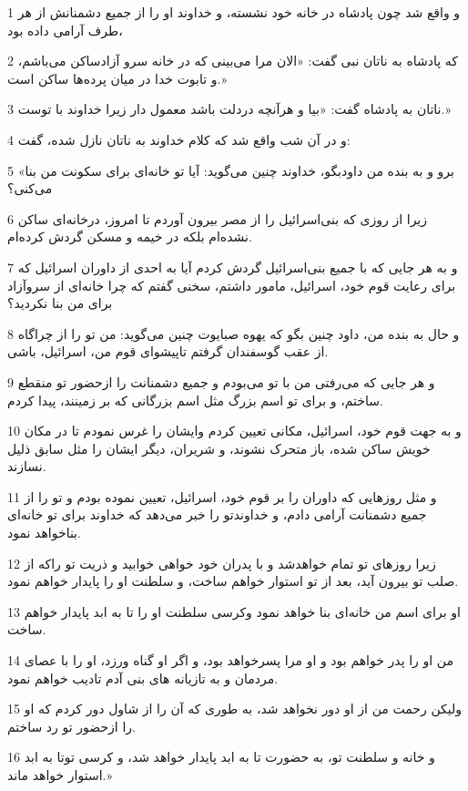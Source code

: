 \par 1 و واقع شد چون پادشاه در خانه خود نشسته، و خداوند او را از جمیع دشمنانش از هر طرف آرامی داده بود، 
\par 2 که پادشاه به ناتان نبی گفت: «الان مرا می‌بینی که در خانه سرو آزادساکن می‌باشم، و تابوت خدا در میان پرده‌ها ساکن است.»
\par 3 ناتان به پادشاه گفت: «بیا و هر‌آنچه دردلت باشد معمول دار زیرا خداوند با توست.»
\par 4 و در آن شب واقع شد که کلام خداوند به ناتان نازل شده، گفت:
\par 5 «برو و به بنده من داودبگو، خداوند چنین می‌گوید: آیا تو خانه‌ای برای سکونت من بنا می‌کنی؟
\par 6 زیرا از روزی که بنی‌اسرائیل را از مصر بیرون آوردم تا امروز، درخانه‌ای ساکن نشده‌ام بلکه در خیمه و مسکن گردش کرده‌ام.
\par 7 و به هر جایی که با جمیع بنی‌اسرائیل گردش کردم آیا به احدی از داوران اسرائیل که برای رعایت قوم خود، اسرائیل، مامور داشتم، سخنی گفتم که چرا خانه‌ای از سروآزاد برای من بنا نکردید؟
\par 8 و حال به بنده من، داود چنین بگو که یهوه صبایوت چنین می‌گوید: من تو را از چراگاه از عقب گوسفندان گرفتم تاپیشوای قوم من، اسرائیل، باشی.
\par 9 و هر جایی که می‌رفتی من با تو می‌بودم و جمیع دشمنانت را ازحضور تو منقطع ساختم، و برای تو اسم بزرگ مثل اسم بزرگانی که بر زمینند، پیدا کردم.
\par 10 و به جهت قوم خود، اسرائیل، مکانی تعیین کردم وایشان را غرس نمودم تا در مکان خویش ساکن شده، باز متحرک نشوند، و شریران، دیگر ایشان را مثل سابق ذلیل نسازند.
\par 11 و مثل روزهایی که داوران را بر قوم خود، اسرائیل، تعیین نموده بودم و تو را از جمیع دشمنانت آرامی دادم، و خداوندتو را خبر می‌دهد که خداوند برای تو خانه‌ای بناخواهد نمود.
\par 12 زیرا روزهای تو تمام خواهدشد و با پدران خود خواهی خوابید و ذریت تو راکه از صلب تو بیرون آید، بعد از تو استوار خواهم ساخت، و سلطنت او را پایدار خواهم نمود.
\par 13 او برای اسم من خانه‌ای بنا خواهد نمود وکرسی سلطنت او را تا به ابد پایدار خواهم ساخت.
\par 14 من او را پدر خواهم بود و او مرا پسرخواهد بود، و اگر او گناه ورزد، او را با عصای مردمان و به تازیانه های بنی آدم تادیب خواهم نمود.
\par 15 ولیکن رحمت من از او دور نخواهد شد، به طوری که آن را از شاول دور کردم که او را ازحضور تو رد ساختم.
\par 16 و خانه و سلطنت تو، به حضورت تا به ابد پایدار خواهد شد، و کرسی توتا به ابد استوار خواهد ماند.»
